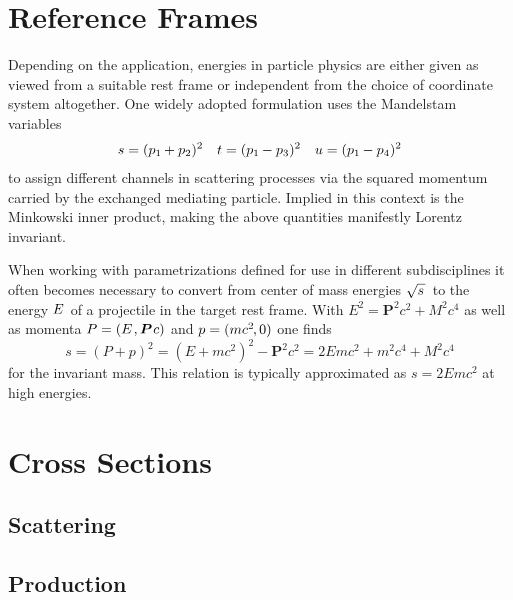 \label{ch:appendix}



\section{Reference Frames}
\label{sec:frames}

Depending on the application, energies in particle physics are either given as viewed from a suitable rest frame or
independent from the choice of coordinate system altogether. One widely adopted formulation uses the Mandelstam variables
\begin{align*}
	s = (p_1 \kern-0.5pt + p_2)^2 &&
	t = (p_1 \kern-0.5pt - p_3)^2 &&
	u = (p_1 \kern-0.5pt - p_4)^2
\end{align*}
to assign different channels in scattering processes via the squared momentum carried by the exchanged mediating particle.
Implied in this context is the Minkowski inner product, making the above quantities manifestly Lorentz invariant.

When working with parametrizations defined for use in different subdisciplines it often becomes necessary to convert from
center of mass energies $\sqrt{s \kern+1.0pt} \kern+1.0pt$ to the energy $\kern-0.5pt E \kern+1.0pt$ of a projectile in the target rest
frame. With $E^2 = \bm{P}^2 c^2 + M^2 c^4$ as well as momenta $P = (E \kern+1.0pt , \bm{P} \kern+0.75pt c)$ and
$p = (m c^2 \kern-1.0pt , 0)$ one finds
\begin{equation*}
	s = (P + p)^2 = (E + m c^2)^2 - \bm{P}^2 c^2 = 2E m c^2 + m^2 c^4 + M^2 c^4
\end{equation*}
for the invariant mass. This relation is typically approximated as $s = 2E m c^2$ at high energies.



\section{Cross Sections}
\label{sec:cross}



\subsection*{Scattering}



\subsection*{Production}

